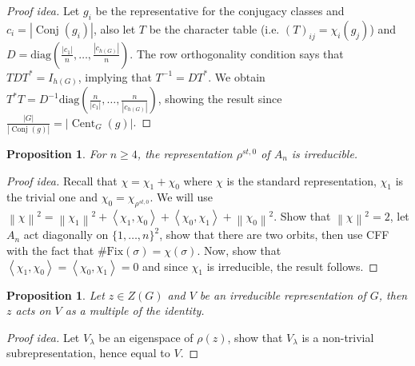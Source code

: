 \documentclass[paper=a4, fontsize=12pt]{scrartcl} %
\newcommand{\bra}[1]{\left(#1\right)}
\newtheorem{prop}[thm]{Proposition}
\theoremstyle{definition}
\theoremstyle{remark}
\DeclareMathOperator{\cent}{Cent}
\DeclareMathOperator{\conjc}{Conj}
\newcommand{\norm}[1]{\left\lVert #1 \right\rVert}
\newcommand{\inp}[2]{\left\langle #1, #2 \right\rangle}
\numberwithin{equation}{section} %
\numberwithin{figure}{section} %
\numberwithin{table}{section} %
\begin{document}
\begin{proof}[Proof idea]
	Let $g_i$ be the representative for the conjugacy classes and $c_i = |\conjc(g_i)|$, also let $T$ be the character table (i.e. $(T)_{ij} = \chi_i(g_j)$) and $D = \text{diag}\bra{\frac{|c_1|}{n}, \dots, \frac{|c_{h(G)}|}{n}}$. The row orthogonality condition says that $TDT^* = I_{h(G)}$, implying that $T^{-1} = DT^*$. We obtain $T^*T = D^{-1} \text{diag}\bra{\frac{n}{|c_1|}, \dots, \frac{n}{|c_{h(G)}|}}$, showing the result since $\frac{|G|}{|\conjc(g)|} = |\cent_G(g)|$.
\end{proof}
\begin{prop}
	For $n \geq 4$, the representation $\rho^{st,0}$ of $A_n$ is irreducible.
\end{prop}
\begin{proof}[Proof idea]
	Recall that $\chi = \chi_1 + \chi_0$ where $\chi$ is the standard representation, $\chi_1$ is the trivial one and $\chi_0 = \chi_{\rho^{st,0}}$. We will use $\norm{\chi}^2 = \norm{\chi_1}^2 + \inp{\chi_1}{\chi_0} + \inp{\chi_0}{\chi_1} + \norm{\chi_0}^2$. Show that $\norm{\chi}^2 = 2$, let $A_n$ act diagonally on $\{1,\dots, n\}^2$, show that there are two orbits, then use CFF with the fact that $\text{\#Fix}(\sigma) = \chi(\sigma)$. Now, show that $\inp{\chi_1}{\chi_0} = \inp{\chi_0}{\chi_1} = 0$ and since $\chi_1$ is irreducible, the result follows.
\end{proof}
\begin{prop}
	Let $z \in Z(G)$ and $V$ be an irreducible representation of $G$, then $z$ acts on $V$ as a multiple of the identity.
\end{prop}
\begin{proof}[Proof idea]
	Let $V_{\lambda}$ be an eigenspace of $\rho(z)$, show that $V_{\lambda}$ is a non-trivial subrepresentation, hence equal to $V$.
\end{proof}
\end{document}
